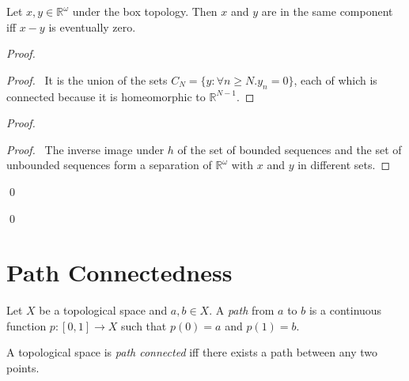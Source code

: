 \begin{prop}
 Let $x, y \in \mathbb{R}^\omega$ under the box topology. Then $x$ and $y$
are in the same component iff $x-y$ is eventually zero.
\end{prop}

\begin{proof}
\pf
{}
\begin{proof}
  \pf\ It is the union of the sets $C_N = \{ y : \forall n \geq N. y_n = 0
  \}$, each of which is connected because it is homeomorphic to
  $\mathbb{R}^{N-1}$.
\end{proof}
\begin{proof}
  \qedstep
  \begin{proof}
    \pf\ The inverse image under $h$ of the set of bounded sequences and the
    set of unbounded sequences form a separation of $\mathbb{R}^\omega$ with
$x$ and $y$ in different sets.
  \end{proof}
  \qed
\end{proof}
\qed
\end{proof}

\section{Path Connectedness}

\begin{df}[Path]
  Let $X$ be a topological space and $a, b \in X$. A \emph{path} from $a$ to
  $b$ is a continuous function $p : [0, 1] \rightarrow X$ such that $p(0) =
  a$ and $p(1) = b$.
\end{df}

\begin{df}
  A topological space is \emph{path connected} iff there exists a path
  between any two points.
\end{df}

